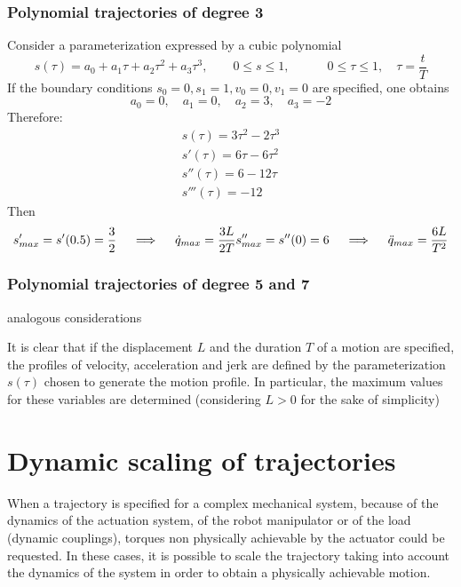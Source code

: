 \documentclass{book}
\begin{document}
\subsubsection{Polynomial trajectories of degree 3}
Consider a parameterization expressed by a cubic polynomial 
\[
    s(\tau)=a_0+a_1\tau+a_2\tau^2+a_3\tau^3, \qquad 0\leq s\leq 1, \quad \qquad 0\leq \tau\leq 1, \quad \tau=\displaystyle\frac{t}{T}
\]
If the boundary conditions $s_0=0,s_1=1,v_0=0,v_1=0$ are specified, one obtains 
\[
    a_0=0, \quad a_1=0, \quad a_2=3, \quad a_3=-2
\]
Therefore: 
\begin{gather*}
    s(\tau) = 3\tau^2-2\tau^3\\
    s'(\tau) = 6\tau-6\tau^2\\
    s''(\tau) = 6-12\tau\\
    s'''(\tau) = -12
\end{gather*}
Then 
\[
    s'_{max}=s'(0.5)=\displaystyle\frac{3}{2} \quad \implies \quad \dot{q}_{max}=\displaystyle\frac{3L}{2T}\\
    s''_{max} = s''(0)=6 \quad \implies \quad \ddot{q}_{max} = \displaystyle\frac{6L}{T^2}
\]
\subsubsection{Polynomial trajectories of degree 5 and 7}
analogous considerations 

It is clear that if the displacement $L$ and the duration $T$ of a motion are specified, the profiles of velocity, acceleration and jerk are defined by the parameterization $s(\tau)$ chosen to generate the motion profile. In particular, the maximum values for these variables are determined (considering $L>0$ for the sake of simplicity)
\section{Dynamic scaling of trajectories}
When a trajectory is specified for a complex mechanical system, because of the dynamics of the actuation system, of the robot manipulator or of the load (dynamic couplings), torques non physically achievable by the actuator could be requested. In these cases, it is possible to scale the trajectory taking into account the dynamics of the system in order to obtain a physically achievable motion. 
\end{document}
